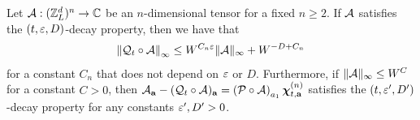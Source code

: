 \begin{claim}\label{lem_+Q} 
Let ${\cal A}: (\Zn)^{n}\to \mathbb C$ be an $n$-dimensional tensor for a fixed $n\ge 2$. If $\cal A$ satisfies the $(t, \e, D)$-decay property, then we have that 
\begin{align}\label{normQA}
\left\|{\cal Q}_t\circ \cal A\right\|_{\infty} \le W^{C_n \e} \|\cal A\|_\infty +W^{-D+C_n}
\end{align}
for a constant $C_n$ that does not depend on $\e$ or $D$. Furthermore, if $\|\cal A\|_\infty\le W^C$ for a constant $C>0$, then $\cal A_{\ba}-({\cal Q}_t\circ \cal A)_{\ba}=\left({\cal P} \circ {\cal A}\right)_{a_1}\dthn^{(n)}_{t, \ba}$ satisfies the $(t, \e', D')$-decay property for any constants $\e',D'>0$. 
\end{claim}



